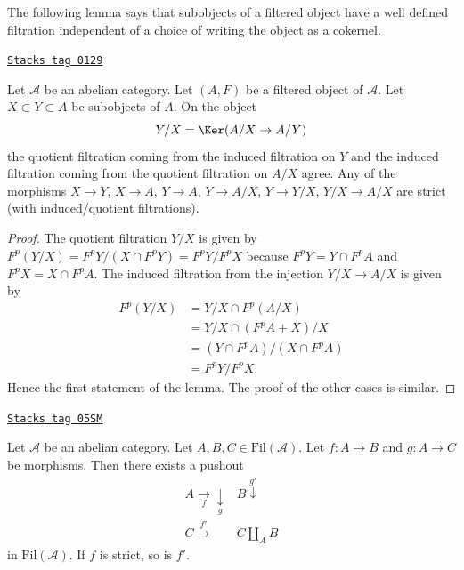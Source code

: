 The following lemma says that subobjects of a filtered object have a well
defined filtration independent of a choice of writing the object as a
cokernel.

\begin{lemma}
\label{homology-lemma-filtration-subobject}
\href{https://stacks.math.columbia.edu/tag/0129}{\texttt{Stacks tag 0129}}

Let $\mathcal{A}$ be an abelian category.
Let $(A, F)$ be a filtered object of $\mathcal{A}$.
Let $X \subset Y \subset A$ be subobjects of $A$.
On the object
$$
Y/X = \Ker(A/X \to A/Y)
$$
the quotient filtration coming from the induced filtration on $Y$ and the
induced filtration coming from the quotient filtration on $A/X$ agree.
Any of the morphisms $X \to Y$, $X \to A$, $Y \to A$, $Y \to A/X$,
$Y \to Y/X$, $Y/X \to A/X$ are strict (with induced/quotient filtrations).
\end{lemma}

\begin{proof}
The quotient filtration $Y/X$ is given by
$F^p(Y/X) = F^pY/(X \cap F^pY) = F^pY/F^pX$
because $F^pY = Y \cap F^pA$ and $F^pX = X \cap F^pA$.
The induced filtration from the injection $Y/X \to A/X$ is given by
\begin{align*}
F^p(Y/X) & = Y/X \cap F^p(A/X) \\
& = Y/X \cap (F^pA + X)/X \\
& = (Y \cap F^pA)/(X \cap F^pA) \\
& = F^pY/F^pX.
\end{align*}
Hence the first statement of the lemma.
The proof of the other cases is similar.
\end{proof}

\begin{lemma}
\label{homology-lemma-pushout-filtered}
\href{https://stacks.math.columbia.edu/tag/05SM}{\texttt{Stacks tag 05SM}}

Let $\mathcal{A}$ be an abelian category.
Let $A, B, C \in \text{Fil}(\mathcal{A})$.
Let $f : A \to B$ and $g : A \to C$ be morphisms.
Then there exists a pushout
$$
\begin{array}{cc}A \underset{f}{\longrightarrow}\underset{g}{\downarrow} & B \overset{g'}{\downarrow} \\ C \overset{f'}{\longrightarrow} & C \amalg_A B\end{array}
$$
in $\text{Fil}(\mathcal{A})$. If $f$ is strict, so is $f'$.
\end{lemma}

